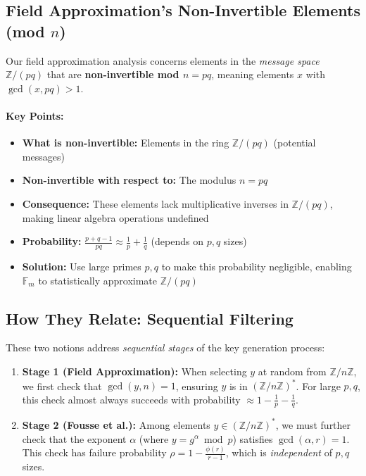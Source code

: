 \documentclass[11pt]{article}
\theoremstyle{definition}
\begin{document}
\subsection{Field Approximation's Non-Invertible Elements (mod $n$)}

Our field approximation analysis concerns elements in the \emph{message space} $\mathbb{Z}/(pq)$ 
that are \textbf{non-invertible mod $n = pq$}, meaning elements $x$ with $\gcd(x, pq) > 1$.

\paragraph{Key Points:}
\begin{itemize}
\item \textbf{What is non-invertible:} Elements in the ring $\mathbb{Z}/(pq)$ (potential messages)
\item \textbf{Non-invertible with respect to:} The modulus $n = pq$
\item \textbf{Consequence:} These elements lack multiplicative inverses in $\mathbb{Z}/(pq)$, 
  making linear algebra operations undefined
\item \textbf{Probability:} $\frac{p + q - 1}{pq} \approx \frac{1}{p} + \frac{1}{q}$ 
  (depends on $p, q$ sizes)
\item \textbf{Solution:} Use large primes $p, q$ to make this probability negligible, 
  enabling $\mathbb{F}_m$ to statistically approximate $\mathbb{Z}/(pq)$
\end{itemize}

\subsection{How They Relate: Sequential Filtering}

These two notions address \emph{sequential stages} of the key generation process:

\begin{enumerate}
\item \textbf{Stage 1 (Field Approximation):} When selecting $y$ at random from 
  $\mathbb{Z}/n\mathbb{Z}$, we first check that $\gcd(y, n) = 1$, ensuring $y$ is 
  in $(\mathbb{Z}/n\mathbb{Z})^*$. For large $p, q$, this check almost always succeeds 
  with probability $\approx 1 - \frac{1}{p} - \frac{1}{q}$.

\item \textbf{Stage 2 (Fousse et al.):} Among elements $y \in (\mathbb{Z}/n\mathbb{Z})^*$, 
  we must further check that the exponent $\alpha$ (where $y = g^\alpha \bmod{p}$) 
  satisfies $\gcd(\alpha, r) = 1$. This check has failure probability $\rho = 1 - \frac{\phi(r)}{r-1}$, 
  which is \emph{independent} of $p, q$ sizes.
\end{enumerate}
\end{document}
